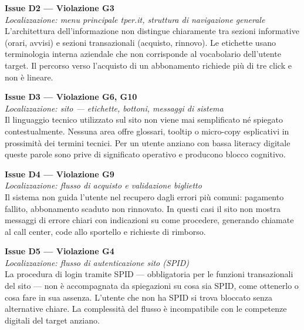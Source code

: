 \documentclass[11pt,a4paper]{article}
\begin{document}
\bigskip

\noindent\textbf{Issue D2 — Violazione G3}\label{iss:D2}\\
\textit{Localizzazione: menu principale tper.it, struttura di navigazione generale}\\

\noindent L'architettura dell'informazione non distingue chiaramente tra sezioni informative (orari, avvisi) e sezioni transazionali (acquisto, rinnovo). Le etichette usano terminologia interna aziendale che non corrisponde al vocabolario dell'utente target. Il percorso verso l'acquisto di un abbonamento richiede più di tre click e non è lineare.

\bigskip

\noindent\textbf{Issue D3 — Violazione G6, G10}\label{iss:D3}\\
\textit{Localizzazione: sito — etichette, bottoni, messaggi di sistema}\\

\noindent Il linguaggio tecnico utilizzato sul sito non viene mai semplificato né spiegato contestualmente. Nessuna area offre glossari, tooltip o micro-copy esplicativi in prossimità dei termini tecnici. Per un utente anziano con bassa literacy digitale queste parole sono prive di significato operativo e producono blocco cognitivo.

\bigskip

\noindent\textbf{Issue D4 — Violazione G9}\label{iss:D4}\\
\textit{Localizzazione: flusso di acquisto e validazione biglietto}\\

\noindent Il sistema non guida l'utente nel recupero dagli errori più comuni: pagamento fallito, abbonamento scaduto non rinnovato. In questi casi il sito non mostra messaggi di errore chiari con indicazioni su come procedere, generando chiamate al call center, code allo sportello e richieste di rimborso.

\bigskip

\noindent\textbf{Issue D5 — Violazione G4}\label{iss:D5}\\
\textit{Localizzazione: flusso di autenticazione sito (SPID)}\\

\noindent La procedura di login tramite SPID — obbligatoria per le funzioni transazionali del sito — non è accompagnata da spiegazioni su cosa sia SPID, come ottenerlo o cosa fare in sua assenza. L'utente che non ha SPID si trova bloccato senza alternative chiare. La complessità del flusso è incompatibile con le competenze digitali del target anziano.
\end{document}

